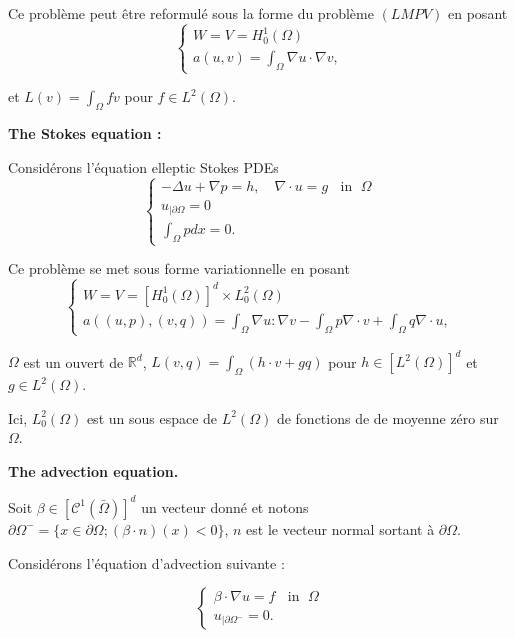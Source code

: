  Ce problème peut être reformulé sous la forme du problème $(LMPV)$ en  posant
$$
\left\{\begin{array}{l}
	W=V=H_{0}^{1}(\Omega) \\
	a(u, v)=\int_{\Omega} \nabla u \cdot \nabla v, 
\end{array}\right.
$$

et  $L(v)=\int_{\Omega} f v$ pour  $f \in L^{2}(\Omega)$.



{\bf The Stokes equation :}  

Considérons l'équation  elleptic Stokes PDEs   
\begin{equation}
\begin{cases}
-\Delta u+\nabla p=h, \quad \nabla \cdot u=g  \;\; \text{ in }\; \Omega\\
u_{\mid \partial \Omega}=0\\
\int_\Omega pdx=0.
\end{cases}
\end{equation}

Ce problème se met sous forme variationnelle en posant
$$
\left\{\begin{array}{l}
	W=V=\left[H_{0}^{1}(\Omega)\right]^{d} \times L_{0}^{2}(\Omega) \\
	a((u, p),(v, q))=\int_{\Omega} \nabla u:\nabla v-\int_{\Omega} p \nabla \cdot v+\int_{\Omega} q \nabla \cdot u, 
\end{array}\right.
$$

$\Omega$ est un ouvert de $\mathbb{R}^d$,   $L(v, q)=\int_{\Omega}(h \cdot v+g q)$ pour  $h\in\left[L^{2}(\Omega)\right]^{d}$ et  $g \in L^{2}(\Omega)$. 

 Ici, $L_{0}^{2}(\Omega)$ est un sous espace de $L^2(\Omega)$ de fonctions de de moyenne zéro sur  $\Omega$. 
 
 

{\bf The advection equation. }

Soit  $\beta \in\left[\mathcal{C}^{1}(\bar{\Omega})\right]^{d}$ un vecteur donné et  notons  $\partial \Omega^{-}=\{x \in \partial \Omega ;(\beta \cdot n)(x)<0\}$, 
$n$ est le vecteur normal sortant à  $\partial \Omega$. 

Considérons  l'équation d'advection  suivante : 

\begin{equation}
	\begin{cases}
	\beta \cdot \nabla u=f  \;\; \text{ in }\; \Omega\\
		u_{\mid \partial \Omega^{-}}=0. 
	\end{cases}
\end{equation}

